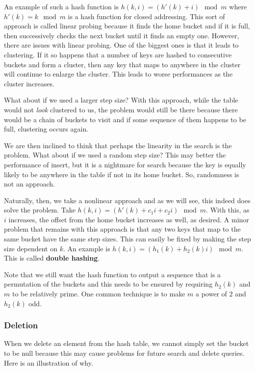 \documentclass[11pt]{article}
\begin{document}
An example of such a hash function is $h(k,i) = (h'(k) + i) \mod m$ where $h'(k) = k \mod m$ is a hash function for closed addressing. This sort of approach is called linear probing because it finds the home bucket and if it is full, then successively checks the next bucket until it finds an empty one. However, there are issues with linear probing. One of the biggest ones is that it leads to clustering. If it so happens that a number of keys are hashed to consecutive buckets and form a cluster, then any key that maps to anywhere in the cluster will continue to enlarge the cluster. This leads to worse performances as the cluster increases.  

What about if we used a larger step size? With this approach, while the table would not \emph{look} clustered to us, the problem would still be there because there would be a chain of buckets to visit and if some sequence of them happens to be full, clustering occurs again. 

We are then inclined to think that perhaps the linearity in the search is the problem. What about if we used a random step size? This may better the performance of insert, but it is a nightmare for search because the key is equally likely to be anywhere in the table if not in its home bucket. So, randomness is not an approach. 

Naturally, then, we take a nonlinear approach and as we will see, this indeed does solve the problem. Take $h(k,i) = (h'(k) + c_1 i + c_2 i) \mod m$. With this, as $i$ increases, the offset from the home bucket increases as well, as desired. A minor problem that remains with this approach is that any two keys that map to the same bucket have the same step sizes. This can easily be fixed by making the step size dependent on $k$. An example is $h(k,i) = (h_1(k) + h_2(k)i) \mod m$. This is called \textbf{double hashing}. 

Note that we still want the hash function to output a sequence that is a permutation of the buckets and this needs to be ensured by requiring $h_2(k)$ and $m$ to be relatively prime. One common technique is to make $m$ a power of $2$ and $h_2(k)$ odd. 

\subsubsection{Deletion}
When we delete an element from the hash table, we cannot simply set the bucket to be null because this may cause problems for future search and delete queries. Here is an illustration of why.
\end{document}
